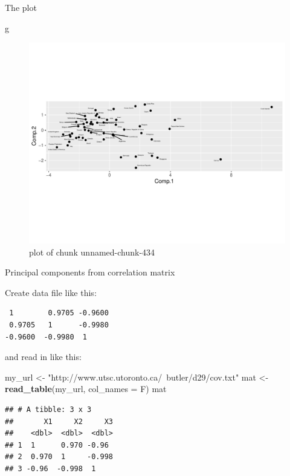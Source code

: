 \documentclass[ignorenonframetext,]{beamer}
\newenvironment{Shaded}{\begin{snugshade}}{\end{snugshade}}
\newcommand{\DataTypeTok}[1]{\textcolor[rgb]{0.13,0.29,0.53}{#1}}
\newcommand{\KeywordTok}[1]{\textcolor[rgb]{0.13,0.29,0.53}{\textbf{#1}}}
\newcommand{\NormalTok}[1]{#1}
\newcommand{\StringTok}[1]{\textcolor[rgb]{0.31,0.60,0.02}{#1}}
\begin{document}
\begin{frame}[fragile]{The plot}
\protect\hypertarget{the-plot-9}{}

\begin{Shaded}
\begin{Highlighting}[]
\NormalTok{g}
\end{Highlighting}
\end{Shaded}

\begin{figure}
\centering
\includegraphics{figure/unnamed-chunk-434-1.pdf}
\caption{plot of chunk unnamed-chunk-434}
\end{figure}

\end{frame}

\begin{frame}[fragile]{Principal components from correlation matrix}
\protect\hypertarget{principal-components-from-correlation-matrix}{}

Create data file like this:

\begin{verbatim}
 1        0.9705 -0.9600
 0.9705   1      -0.9980
-0.9600  -0.9980  1
\end{verbatim}

and read in like this:

\begin{Shaded}
\begin{Highlighting}[]
\NormalTok{my_url <-}\StringTok{ "http://www.utsc.utoronto.ca/~butler/d29/cov.txt"}
\NormalTok{mat <-}\StringTok{ }\KeywordTok{read_table}\NormalTok{(my_url, }\DataTypeTok{col_names =}\NormalTok{ F)}
\NormalTok{mat}
\end{Highlighting}
\end{Shaded}

\begin{verbatim}
## # A tibble: 3 x 3
##       X1     X2     X3
##    <dbl>  <dbl>  <dbl>
## 1  1      0.970 -0.96 
## 2  0.970  1     -0.998
## 3 -0.96  -0.998  1
\end{verbatim}

\end{frame}
\end{document}
